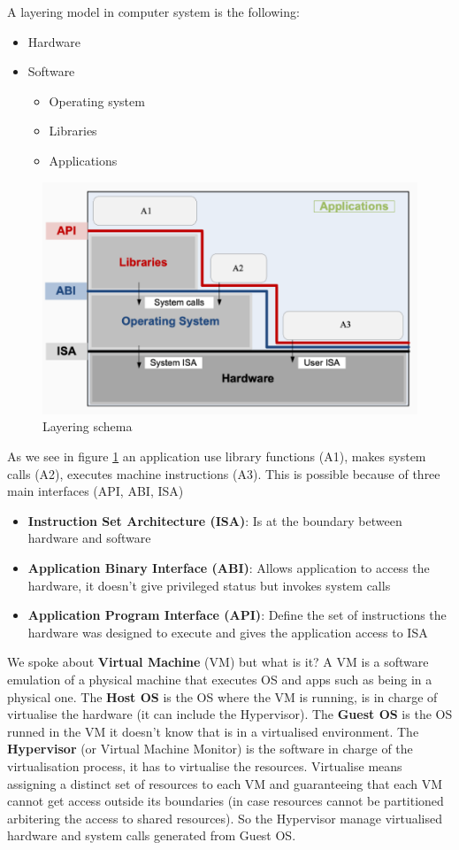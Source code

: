 A layering model in computer system is the following:
\begin{itemize}
    \item Hardware
    \item Software
    \begin{itemize}
        \item Operating system
        \item Libraries
        \item Applications
    \end{itemize}
\end{itemize}
\begin{figure}
    \centering
    \includegraphics[scale=0.5]{images/layering.png}
    \caption{Layering schema}
    \label{fig:layers}
\end{figure}
As we see in figure \ref{fig:layers} an application use library functions (A1), makes system calls (A2), executes machine instructions (A3). This is possible because of three main interfaces (API, ABI, ISA)
\begin{itemize}
    \item \textbf{Instruction Set Architecture (ISA)}: Is at the boundary between hardware and software
    \item \textbf{Application Binary Interface (ABI)}: Allows application to access the hardware, it doesn't give privileged status but invokes system calls
    \item \textbf{Application Program Interface (API)}: Define the set of instructions the hardware was designed to execute and gives the application access to ISA
\end{itemize}
We spoke about \textbf{Virtual Machine} (VM) but what is it? A VM is a software emulation of a physical machine that executes OS and apps such as being in a physical one. The \textbf{Host OS} is the OS where the VM is running, is in charge of virtualise the hardware (it can include the Hypervisor). The \textbf{Guest OS} is the OS runned in the VM it doesn't know that is in a virtualised environment. The \textbf{Hypervisor} (or Virtual Machine Monitor) is the software in charge of the virtualisation process, it has to virtualise the resources. Virtualise means assigning a distinct set of resources to each VM and guaranteeing that each VM cannot get access outside its boundaries (in case resources cannot be partitioned arbitering the access to shared resources). So the Hypervisor manage virtualised hardware and system calls generated from Guest OS.

